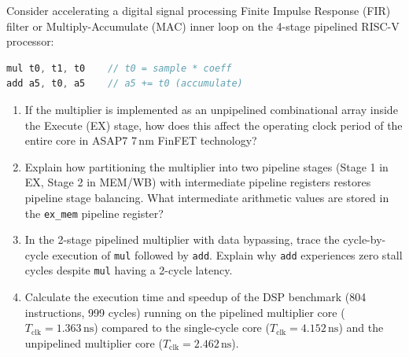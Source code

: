 \begin{problem}
Consider accelerating a digital signal processing Finite Impulse Response (FIR) filter or Multiply-Accumulate (MAC) inner loop on the 4-stage pipelined RISC-V processor:
\begin{lstlisting}[language=c]
mul t0, t1, t0    // t0 = sample * coeff
add a5, t0, a5    // a5 += t0 (accumulate)
\end{lstlisting}
\begin{enumerate}
    \item If the multiplier is implemented as an unpipelined combinational array inside the Execute (EX) stage, how does this affect the operating clock period of the entire core in ASAP7 7\,nm FinFET technology?
    \item Explain how partitioning the multiplier into two pipeline stages (Stage 1 in EX, Stage 2 in MEM/WB) with intermediate pipeline registers restores pipeline stage balancing. What intermediate arithmetic values are stored in the \texttt{ex\_mem} pipeline register?
    \item In the 2-stage pipelined multiplier with data bypassing, trace the cycle-by-cycle execution of \texttt{mul} followed by \texttt{add}. Explain why \texttt{add} experiences zero stall cycles despite \texttt{mul} having a 2-cycle latency.
    \item Calculate the execution time and speedup of the DSP benchmark (804 instructions, 999 cycles) running on the pipelined multiplier core ($T_{\text{clk}} = 1.363\,\text{ns}$) compared to the single-cycle core ($T_{\text{clk}} = 4.152\,\text{ns}$) and the unpipelined multiplier core ($T_{\text{clk}} = 2.462\,\text{ns}$).
\end{enumerate}


\end{problem}

